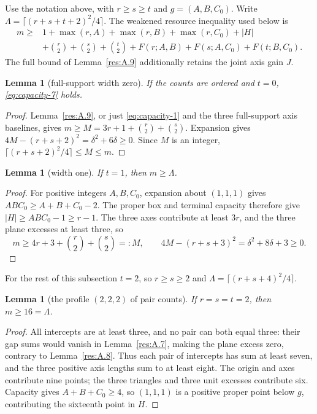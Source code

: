 \documentclass[11pt]{article}
\newtheorem{lemma}[theorem]{Lemma}
\theoremstyle{definition}
\theoremstyle{remark}
\theoremstyle{plain}
\begin{document}
Use the notation above, with $r\ge s\ge t$ and
$g=(A,B,C_0)$. Write $\Lambda=\lceil(r+s+t+2)^2/4\rceil$. The weakened resource inequality used below is
\[
\begin{split}
 m\ge{}&1+\max(r,A)+\max(r,B)+\max(r,C_0)+|H|\\
 &+\binom r2+\binom s2+\binom t2
   +F(r;A,B)+F(s;A,C_0)+F(t;B,C_0).
\end{split}\tag{3.10}\label{eq:capacity-10}
\]
The full bound of Lemma~\ref{res:A.9} additionally retains the joint axis gain $J$.

\begin{lemma}[full-support width zero]\label{res:A.19} If the counts are ordered and \(t=0\), \eqref{eq:capacity-7} holds.
\end{lemma}
\begin{proof} Lemma~\ref{res:A.9}, or just \eqref{eq:capacity-1} and the three full-support axis baselines, gives \(m\ge M=3r+1+\binom r2+\binom s2\). Expansion gives \(4M-(r+s+2)^2=\delta^2+6\delta\ge0\). Since \(M\) is an integer, \(\lceil(r+s+2)^2/4\rceil\le M\le m\). \end{proof}


\begin{lemma}[width one]\label{res:A12.1}
If $t=1$, then $m\ge \Lambda$.
\end{lemma}
\begin{proof}
For positive integers $A,B,C_0$, expansion about $(1,1,1)$ gives
$ABC_0\ge A+B+C_0-2$.  The proper box and terminal capacity therefore
give $|H|\ge ABC_0-1\ge r-1$.  The three axes contribute at least
$3r$, and the three plane excesses at least three, so
\[
 m\ge4r+3+\binom r2+\binom s2=:M,\qquad
 4M-(r+s+3)^2=\delta^2+8\delta+3\ge0.
\]
\end{proof}

For the rest of this subsection $t=2$, so $r\ge s\ge2$ and
$\Lambda=\lceil(r+s+4)^2/4\rceil$.

\begin{lemma}[the profile $(2,2,2)$ of pair counts]\label{res:A12.2}
If $r=s=t=2$, then $m\ge16=\Lambda$.
\end{lemma}
\begin{proof}
All intercepts are at least three, and no pair can both equal three:
their gap sums would vanish in Lemma~\ref{res:A.7}, making the plane excess zero,
contrary to Lemma~\ref{res:A.8}.  Thus each pair of intercepts has sum at least seven,
and the three positive axis lengths sum to at least eight.
The origin and axes contribute nine points; the three triangles and
three unit excesses contribute six.  Capacity gives
$A+B+C_0\ge4$, so $(1,1,1)$ is a positive proper point below $g$,
contributing the sixteenth point in $H$. \end{proof}
\end{document}
